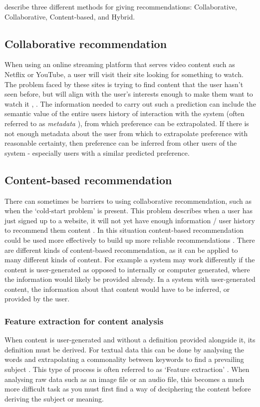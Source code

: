 \documentclass[a4paper,12pt]{report}
\begin{document}
    \cite{jannach2010recommender} describe three different methods for giving recommendations: Collaborative, Collaborative, Content-based, and Hybrid.

    \subsection{Collaborative recommendation}
      When using an online streaming platform that serves video content such as Netflix or YouTube, a user will visit their site looking for something to watch. The problem faced by these sites is trying to find content that the user hasn't seen before, but will align with the user's interests enough to make them want to watch it \citep{davidson2010youtube}, \citep{gomez2016netflix}.
      The information needed to carry out such a prediction can include the semantic value of the entire users history of interaction with the system (often referred to as \textit{metadata} \citep{duval2002metadata}), from which preference can be extrapolated. If there is not enough metadata about the user from which to extrapolate preference with reasonable certainty, then preference can be inferred from other users of the system - especially users with a similar predicted preference.

    \subsection{Content-based recommendation}
      There can sometimes be barriers to using collaborative recommendation, such as when the ‘cold-start problem’ is present. This problem describes when a user has just signed up to a website, it will not yet have enough information / user history to recommend them content \citep{schein2002methods}.
      In this situation content-based recommendation could be used more effectively to build up more reliable recommendations \citep{lops2011content}.
      There are different kinds of content-based recommendation, as it can be applied to many different kinds of content. For example a system may work differently if the content is user-generated as opposed to internally or computer generated, where the information would likely be provided already. In a system with user-generated content, the information about that content would have to be inferred, or provided by the user.

      \subsubsection{Feature extraction for content analysis}
        When content is user-generated and without a definition provided alongside it, its definition must be derived. For textual data this can be done by analysing the words and extrapolating a commonality between keywords to find a prevailing subject \citep{sanderson1999deriving}.
        This type of process is often referred to as ‘Feature extraction’ \citep{guyon2006introduction}.
        When analysing raw data such as an image file or an audio file, this becomes a much more difficult task as you must first find a way of deciphering the content before deriving the subject or meaning.
\end{document}
